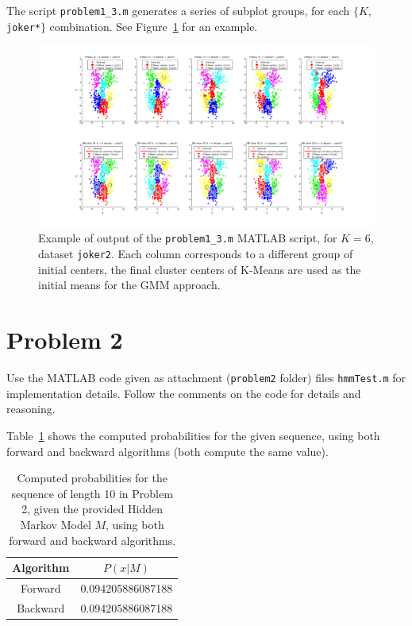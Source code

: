 \documentclass[paper=a4, fontsize=11pt]{scrartcl} %
\numberwithin{equation}{section} %
\numberwithin{figure}{section} %
\numberwithin{table}{section} %
\newcommand{\vertbreak}{\vspace{1.75 mm}}
\begin{document}
The script \verb+problem1_3.m+ generates a series of subplot groups, for each 
$\{K,$\verb+joker*+$\}$ combination. See Figure~\ref{fig:1-3} for an example.

\begin{figure}[h!]

    \centering
    \includegraphics[width=1.00\textwidth]{figures/1-3.png}
    \cprotect\caption{Example of output of the \verb+problem1_3.m+ MATLAB script, for 
        $K = 6$, dataset \verb+joker2+. Each column corresponds to a different 
        group of initial centers, the final cluster centers of K-Means are used as 
        the initial means for the GMM approach.}
    \label{fig:1-3}

\end{figure}

\section{Problem 2}

Use the MATLAB code given as attachment (\verb+problem2+ folder) files 
\verb+hmmTest.m+ for implementation details. Follow the comments on the code 
for details and reasoning.\vertbreak

Table~\ref{tab:2-1} shows the computed probabilities for the given sequence, 
using both forward and backward algorithms (both compute the same value).

\begin{table}[H]
\begin{center}
    \small
        \begin{tabularx}{0.35\textwidth}{ c | c }
            Algorithm   & $P(x|M)$          \\ [0.5ex]
            \hline
            Forward     & 0.094205886087188 \\ [0.5ex]
            Backward    & 0.094205886087188 \\ [0.5ex]
        \end{tabularx}
    \caption{Computed probabilities for the sequence of length 10 in Problem 
            2, given the provided Hidden Markov Model $M$, using both forward 
            and backward algorithms.}
    \label{tab:2-1}
    \end{center}
\end{table}
\end{document}
